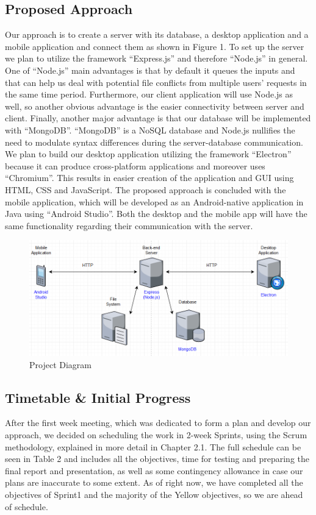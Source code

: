 \documentclass[11pt]{article}
\begin{document}
\subsection{Proposed Approach}
Our approach is to create a server with its database, a desktop application and a mobile application and connect them as shown in Figure 1. 
To set up the server we plan to utilize the framework “Express.js” and therefore “Node.js” in general. One of “Node.js” main advantages is that by default it queues the inputs and that can help us deal with potential file conflicts from multiple users’ requests in the same time period. Furthermore, our client application will use Node.js as well, so another obvious advantage is the easier connectivity between server and client. Finally, another major advantage is that our database will be implemented with “MongoDB”. “MongoDB” is a NoSQL database and Node.js nullifies the need to modulate syntax differences during the server-database communication. We plan to build our desktop application utilizing the framework “Electron” because it can produce cross-platform applications and moreover uses “Chromium”. This results in easier creation of the application and GUI using HTML, CSS and JavaScript. The proposed approach is concluded with the mobile application, which will be developed as an Android-native application in Java using “Android Studio”. Both the desktop and the mobile app will have the same functionality regarding their communication with the server.

\begin{figure}[h]
	\centering
	\includegraphics[scale=0.65]{graphics/ProjectDiagram.png}
	\caption{Project Diagram}
\end{figure}

\subsection{Timetable \& Initial Progress}
After the first week meeting, which was dedicated to form a plan and develop our approach, we decided on scheduling the work in 2-week Sprints, using the Scrum methodology, explained in more detail in Chapter 2.1. The full schedule can be seen in Table 2 and includes all the objectives, time for testing and preparing the final report and presentation, as well as some contingency allowance in case our plans are inaccurate to some extent. As of right now, we have completed all the objectives of Sprint1 and the majority of the Yellow objectives, so we are ahead of schedule. \\
\end{document}
